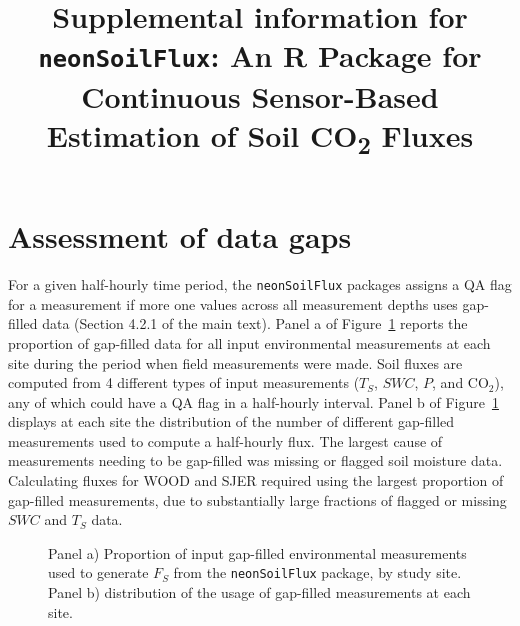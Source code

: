\documentclass[
  letterpaper,
  DIV=11,
  numbers=noendperiod]{scrartcl}
\title{Supplemental information for \texttt{neonSoilFlux}: An R Package
for Continuous Sensor-Based Estimation of Soil CO\textsubscript{2}
Fluxes}
\author{}
\date{}
\begin{document}
\maketitle

\section{Assessment of data gaps}\label{assessment-of-data-gaps}

For a given half-hourly time period, the \texttt{neonSoilFlux} packages
assigns a QA flag for a measurement if more one values across all
measurement depths uses gap-filled data (Section 4.2.1 of the main
text). Panel a of Figure~\ref{fig-gap-filled-stats} reports the
proportion of gap-filled data for all input environmental measurements
at each site during the period when field measurements were made. Soil
fluxes are computed from 4 different types of input measurements
(\(T_{S}\), \(SWC\), \(P\), and CO\(_{2}\)), any of which could have a
QA flag in a half-hourly interval. Panel b of
Figure~\ref{fig-gap-filled-stats} displays at each site the distribution
of the number of different gap-filled measurements used to compute a
half-hourly flux. The largest cause of measurements needing to be
gap-filled was missing or flagged soil moisture data. Calculating fluxes
for WOOD and SJER required using the largest proportion of gap-filled
measurements, due to substantially large fractions of flagged or missing
\(SWC\) and \(T_{S}\) data.

\begin{figure}


\caption{\label{fig-gap-filled-stats}Panel a) Proportion of input
gap-filled environmental measurements used to generate \(F_{S}\) from
the \texttt{neonSoilFlux} package, by study site. Panel b) distribution
of the usage of gap-filled measurements at each site.}

\end{figure}%
\end{document}
